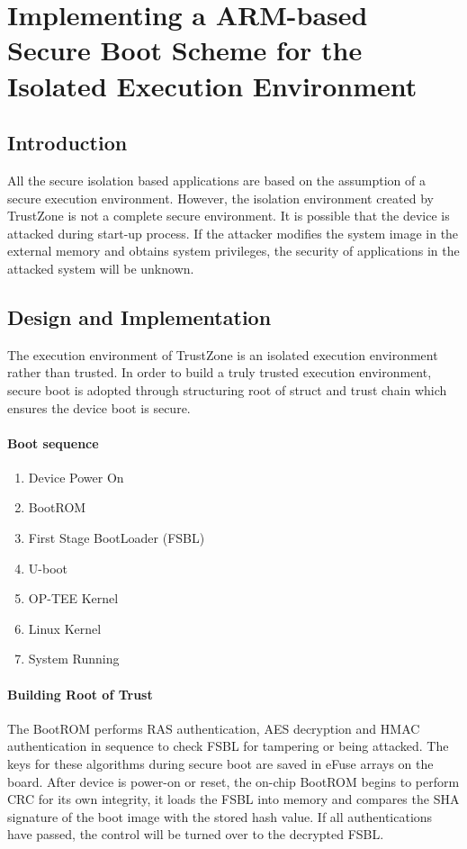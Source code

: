 \documentclass{article}
\begin{document}
\section{Implementing a ARM-based Secure Boot Scheme for the Isolated Execution Environment}

\subsection{Introduction}

All the secure isolation based applications are based on the assumption of a secure execution environment. However, the isolation environment created by TrustZone is not a complete secure environment. It is possible that the device is attacked during start-up process. If the attacker modifies the system image in the external memory and obtains system privileges, the security of applications in the attacked system will be unknown.

\subsection{Design and Implementation}

The execution environment of TrustZone is an isolated execution environment rather than trusted. In order to build a truly trusted execution environment, secure boot is adopted through structuring root of struct and trust chain which ensures the device boot is secure.

\paragraph{Boot sequence}

\begin{enumerate}
\item Device Power On
\item BootROM
\item First Stage BootLoader (FSBL)
\item U-boot
\item OP-TEE Kernel
\item Linux Kernel
\item  System Running
\end{enumerate}

\paragraph{Building Root of Trust}

The BootROM performs RAS authentication, AES decryption and HMAC authentication in sequence to check FSBL for tampering or being attacked. The keys for these algorithms during secure boot are saved in eFuse arrays on the board. After device is power-on or reset, the on-chip BootROM begins to perform CRC for its own integrity, it loads the FSBL into memory and compares the SHA signature of the boot image with the stored hash value. If all authentications have passed, the control will be turned over to the decrypted FSBL.
\end{document}
